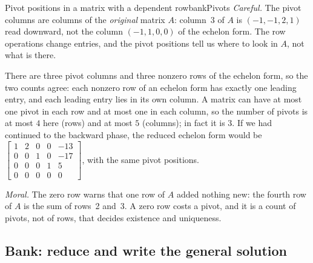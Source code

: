 \documentclass[11pt]{article}
\begin{document}
\begin{exmp}{Pivot positions in a matrix with a dependent row}{bankPivots}
\emph{Careful.} The pivot columns are columns of the \emph{original} matrix $A$: column~$3$ of $A$ is $(-1,-1,2,1)$ read downward, not the column $(-1,1,0,0)$ of the echelon form. The row operations change entries, and the pivot positions tell us where to look in $A$, not what is there.

There are three pivot columns and three nonzero rows of the echelon form, so the two counts agree: each nonzero row of an echelon form has exactly one leading entry, and each leading entry lies in its own column. A matrix can have at most one pivot in each row and at most one in each column, so the number of pivots is at most $4$ here (rows) and at most $5$ (columns); in fact it is $3$. If we had continued to the backward phase, the reduced echelon form would be $\begin{bmatrix}1&2&0&0&-13\\0&0&1&0&-17\\0&0&0&1&5\\0&0&0&0&0\end{bmatrix}$, with the same pivot positions.

\emph{Moral.} The zero row warns that one row of $A$ added nothing new: the fourth row of $A$ is the sum of rows~2 and~3. A zero row costs a pivot, and it is a count of pivots, not of rows, that decides existence and uniqueness.
\end{exmp}

\subsection*{Bank: reduce and write the general solution}
\end{document}
